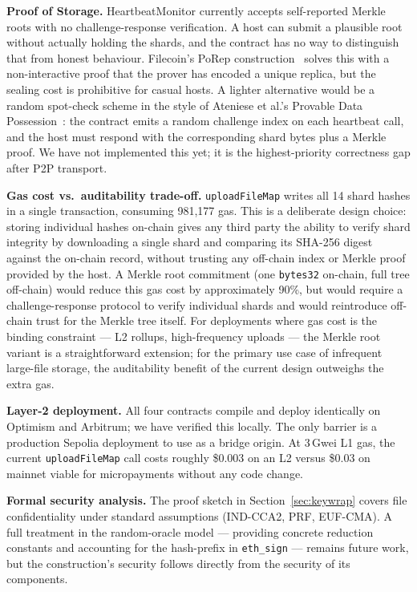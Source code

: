 \documentclass[journal]{IEEEtran}
\newcommand{\UploadFileMapGas}{981{,}177}
\begin{document}
\noindent\textbf{Proof of Storage.}
HeartbeatMonitor currently accepts self-reported Merkle roots with no
challenge-response verification. A host can submit a plausible root
without actually holding the shards, and the contract has no way to
distinguish that from honest behaviour. Filecoin's PoRep
construction~\cite{filecoin2020} solves this with a non-interactive
proof that the prover has encoded a unique replica, but the sealing
cost is prohibitive for casual hosts. A lighter alternative would be
a random spot-check scheme in the style of Ateniese et al.'s
Provable Data Possession~\cite{ateniese2007}: the contract emits a
random challenge index on each heartbeat call, and the host must
respond with the corresponding shard bytes plus a Merkle proof.
We have not implemented this yet; it is the highest-priority correctness
gap after P2P transport.

\noindent\textbf{Gas cost vs.\ auditability trade-off.}
\texttt{uploadFileMap} writes all 14 shard hashes in a single transaction,
consuming \UploadFileMapGas{} gas.
This is a deliberate design choice: storing individual hashes on-chain
gives any third party the ability to verify shard integrity by downloading
a single shard and comparing its SHA-256 digest against the on-chain record,
without trusting any off-chain index or Merkle proof provided by the host.
A Merkle root commitment (one \texttt{bytes32} on-chain, full tree
off-chain) would reduce this gas cost by approximately 90\%, but would
require a challenge-response protocol to verify individual shards and
would reintroduce off-chain trust for the Merkle tree itself.
For deployments where gas cost is the binding constraint — L2 rollups, high-frequency
uploads — the Merkle root variant is a straightforward extension; for the
primary use case of infrequent large-file storage, the auditability benefit
of the current design outweighs the extra gas.

\noindent\textbf{Layer-2 deployment.}
All four contracts compile and deploy identically on Optimism and Arbitrum;
we have verified this locally. The only barrier is a production Sepolia
deployment to use as a bridge origin. At 3\,Gwei L1 gas, the current
\texttt{uploadFileMap} call costs roughly \$0.003 on an L2 versus
\$0.03 on mainnet \textemdash{} viable for micropayments without any code change.

\noindent\textbf{Formal security analysis.}
The proof sketch in Section~\ref{sec:keywrap} covers file confidentiality
under standard assumptions (IND-CCA2, PRF, EUF-CMA).
A full treatment in the random-oracle model — providing concrete reduction
constants and accounting for the hash-prefix in \texttt{eth\_sign} —
remains future work, but the construction's security follows
directly from the security of its components.
\end{document}
